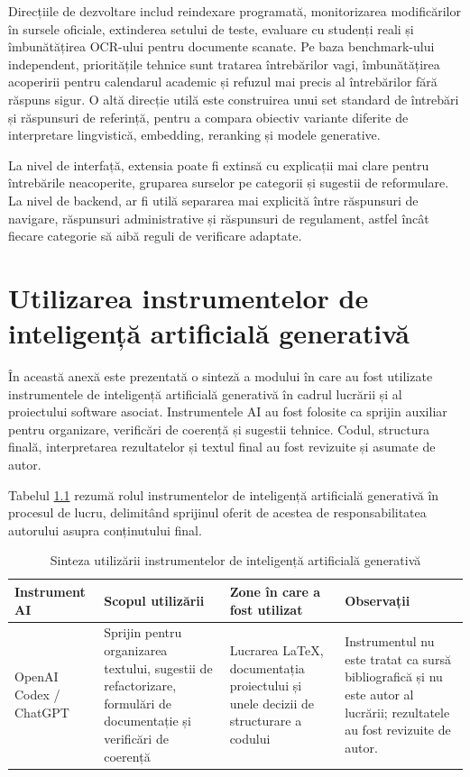 \documentclass[12pt,a4paper]{report}
\theoremstyle{definition}
\theoremstyle{remark}
\begin{document}
Direcțiile de dezvoltare includ reindexare programată, monitorizarea modificărilor în sursele oficiale, extinderea setului de teste, evaluare cu studenți reali și îmbunătățirea OCR-ului pentru documente scanate. Pe baza benchmark-ului independent, prioritățile tehnice sunt tratarea întrebărilor vagi, îmbunătățirea acoperirii pentru calendarul academic și refuzul mai precis al întrebărilor fără răspuns sigur. O altă direcție utilă este construirea unui set standard de întrebări și răspunsuri de referință, pentru a compara obiectiv variante diferite de interpretare lingvistică, embedding, reranking și modele generative.

La nivel de interfață, extensia poate fi extinsă cu explicații mai clare pentru întrebările neacoperite, gruparea surselor pe categorii și sugestii de reformulare. La nivel de backend, ar fi utilă separarea mai explicită între răspunsuri de navigare, răspunsuri administrative și răspunsuri de regulament, astfel încât fiecare categorie să aibă reguli de verificare adaptate.

\cleardoublepage
{}
{}



\appendix
\chapter{Utilizarea instrumentelor de inteligență artificială generativă}
\label{genAIUsage}
În această anexă este prezentată o sinteză a modului în care au fost utilizate instrumentele de inteligență artificială generativă în cadrul lucrării și al proiectului software asociat. Instrumentele AI au fost folosite ca sprijin auxiliar pentru organizare, verificări de coerență și sugestii tehnice. Codul, structura finală, interpretarea rezultatelor și textul final au fost revizuite și asumate de autor.

Tabelul \ref{tab:genAIOverview} rezumă rolul instrumentelor de inteligență artificială generativă în procesul de lucru, delimitând sprijinul oferit de acestea de responsabilitatea autorului asupra conținutului final.

\begin{table}[h!]
    \centering
    \small
    \begin{tabularx}{\textwidth}{|l|X|X|X|}
        \hline \rowcolor{blue!20}
        Instrument AI & Scopul utilizării & Zone în care a fost utilizat & Observații \\
        \hline
        OpenAI Codex / ChatGPT & Sprijin pentru organizarea textului, sugestii de refactorizare, formulări de documentație și verificări de coerență & Lucrarea LaTeX, documentația proiectului și unele decizii de structurare a codului & Instrumentul nu este tratat ca sursă bibliografică și nu este autor al lucrării; rezultatele au fost revizuite de autor. \\
        \hline
    \end{tabularx}
    \caption{Sinteza utilizării instrumentelor de inteligență artificială generativă}
    \label{tab:genAIOverview}
\end{table}
\end{document}
